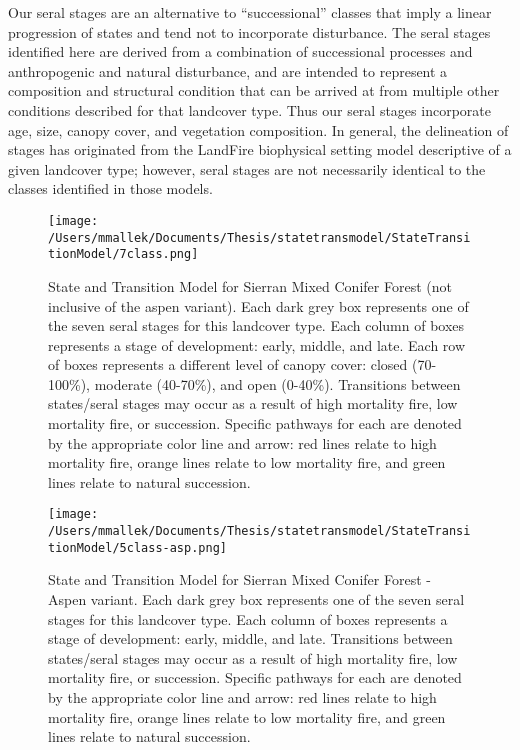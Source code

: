 Our seral stages are an alternative to ``successional'' classes that imply a linear progression of states and tend not to incorporate disturbance. The seral stages identified here are derived from a combination of successional processes and anthropogenic and natural disturbance, and are intended to represent a composition and structural condition that can be arrived at from multiple other conditions described for that landcover type. Thus our seral stages incorporate age, size, canopy cover, and vegetation composition. In general, the delineation of stages has originated from the LandFire biophysical setting model descriptive of a given landcover type; however, seral stages are not necessarily identical to the classes identified in those models.


\begin{figure}[hbp]
\centering
\texttt{[image: /Users/mmallek/Documents/Thesis/statetransmodel/StateTransitionModel/7class.png]}
\caption{State and Transition Model for Sierran Mixed Conifer Forest (not inclusive of the aspen variant). Each dark grey box represents one of the seven seral stages for this landcover type. Each column of boxes represents a stage of development: early, middle, and late. Each row of boxes represents a different level of canopy cover: closed (70-100\%), moderate (40-70\%), and open (0-40\%). Transitions between states/seral stages may occur as a result of high mortality fire, low mortality fire, or succession. Specific pathways for each are denoted by the appropriate color line and arrow: red lines relate to high mortality fire, orange lines relate to low mortality fire, and green lines relate to natural succession.} 
\label{transmodel_smc}
\end{figure}

\begin{figure}[htbp]
\centering
\texttt{[image: /Users/mmallek/Documents/Thesis/statetransmodel/StateTransitionModel/5class-asp.png]}
\caption{State and Transition Model for Sierran Mixed Conifer Forest - Aspen variant. Each dark grey box represents one of the seven seral stages for this landcover type. Each column of boxes represents a stage of development: early, middle, and late. Transitions between states/seral stages may occur as a result of high mortality fire, low mortality fire, or succession. Specific pathways for each are denoted by the appropriate color line and arrow: red lines relate to high mortality fire, orange lines relate to low mortality fire, and green lines relate to natural succession.} 
\label{transmodel_smc-asp}
\end{figure}

